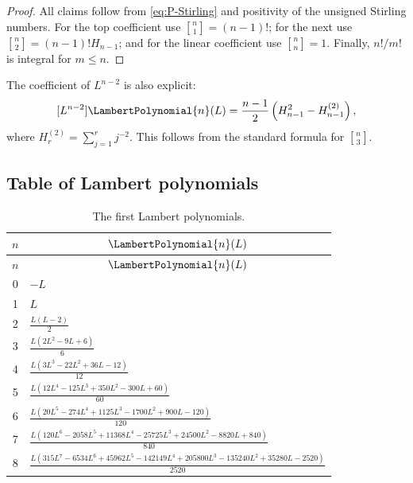 \documentclass[11pt]{article}
\theoremstyle{pltheorem}
\newcommand{\stirlingone}[2]{\genfrac{[}{]}{0pt}{}{#1}{#2}}
\begin{document}
\begin{proof}
All claims follow from \cref{eq:P-Stirling} and positivity of the unsigned Stirling numbers.  For the top coefficient use
\(\stirlingone{n}{1}=(n-1)!\); for the next use
\(\stirlingone{n}{2}=(n-1)!H_{n-1}\); and for the linear coefficient use
\(\stirlingone{n}{n}=1\).  Finally, \(n!/m!\) is integral for \(m\le n\).
\end{proof}

The coefficient of \(L^{n-2}\) is also explicit:
\begin{equation}\label{eq:P-third-leading}
 [L^{n-2}]\LambertPolynomial{n}(L)
 =\frac{n-1}{2}\left(H_{n-1}^2-H_{n-1}^{(2)}\right),
\end{equation}
where \(H_r^{(2)}=\sum_{j=1}^rj^{-2}\).  This follows from the standard formula for \(\stirlingone{n}{3}\).

\subsection{Table of Lambert polynomials}

{\small
\begin{longtable}{@{}c p{}@{}}
\caption{The first Lambert polynomials.}\label{tab:Lambert-polynomials}\\
\toprule
\(n\)&\multicolumn{1}{c}{\(\LambertPolynomial{n}(L)\)}\\
\midrule
\endfirsthead
\toprule
\(n\)&\multicolumn{1}{c}{\(\LambertPolynomial{n}(L)\)}\\
\midrule
\endhead
0&\(-L\)\\[0.35em]
1&\(L\)\\[0.35em]
2&\(\displaystyle\frac{L(L-2)}2\)\\[0.55em]
3&\(\displaystyle\frac{L(2L^2-9L+6)}6\)\\[0.55em]
4&\(\displaystyle\frac{L(3L^3-22L^2+36L-12)}{12}\)\\[0.55em]
5&\(\displaystyle\frac{L(12L^4-125L^3+350L^2-300L+60)}{60}\)\\[0.55em]
6&\(\displaystyle\frac{L(20L^5-274L^4+1125L^3-1700L^2+900L-120)}{120}\)\\[0.55em]
7&\(\displaystyle\frac{L(120L^6-2058L^5+11368L^4-25725L^3+24500L^2-8820L+840)}{840}\)\\[0.55em]
8&\(\displaystyle\frac{L(315L^7-6534L^6+45962L^5-142149L^4+205800L^3-135240L^2+35280L-2520)}{2520}\)\\
\bottomrule
\end{longtable}
}
\end{document}
